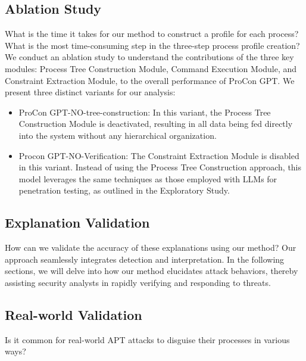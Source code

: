 \subsection{Ablation Study}
\label{sec-ab-study}

What is the time it takes for our method to construct a profile for each process? What is the most time-consuming step in the three-step process profile creation?
We conduct an ablation study to understand the contributions of the three key modules: Process Tree Construction Module, Command Execution Module, and Constraint Extraction Module, to the overall performance of ProCon GPT. We present three distinct variants for our analysis:

\begin{itemize}
    \item ProCon GPT-NO-tree-construction: In this variant, the Process Tree Construction Module is deactivated, resulting in all data being fed directly into the system without any hierarchical organization.
    \item Procon GPT-NO-Verification: The Constraint Extraction Module is disabled in this variant. Instead of using the Process Tree Construction approach, this model leverages the same techniques as those employed with LLMs for penetration testing, as outlined in the Exploratory Study.
\end{itemize}

\subsection{Explanation Validation}
\label{sec-explanation-val}
How can we validate the accuracy of these explanations using our method?
Our approach seamlessly integrates detection and interpretation. In the following sections, we will delve into how our method elucidates attack behaviors, thereby assisting security analysts in rapidly verifying and responding to threats.

\subsection{Real-world Validation}
\label{sec-real-world}
Is it common for real-world APT attacks to disguise their processes in various ways?

